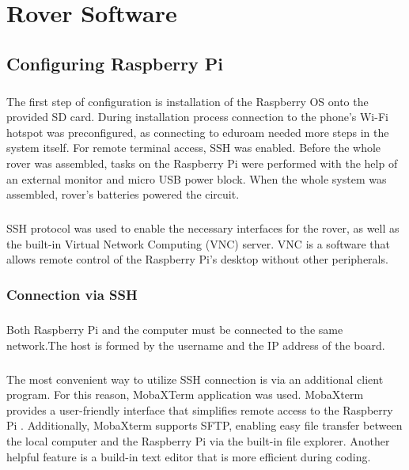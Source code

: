\chapter{Rover Software}
\section{Configuring Raspberry Pi}
\paragraph{}The first step of configuration is installation of the Raspberry OS onto the provided SD card. During installation process connection to the phone’s Wi-Fi hotspot was preconfigured, as connecting to eduroam needed more steps in the system itself. For remote terminal access, SSH was enabled.
Before the whole rover was assembled, tasks on the  Raspberry Pi were performed with the help of an external monitor and micro USB power block. When the whole system was assembled, rover's batteries powered the circuit. 
\paragraph{}SSH protocol was used to enable the necessary interfaces for the rover, as well as the built-in Virtual Network Computing (VNC) server. VNC is a software that allows remote control of the Raspberry Pi’s desktop without other peripherals. 

\subsection{Connection via SSH}
\paragraph{}Both Raspberry Pi and the computer must be connected to the same network.The host is formed by the username and the IP address of the board. 
\paragraph{} The most convenient way to utilize SSH connection is via an additional client program. For this reason, MobaXTerm application was used. MobaXterm provides a user-friendly interface that simplifies remote access to the Raspberry Pi \cite{mobxterm:main}. Additionally, MobaXterm supports SFTP, enabling easy file transfer between the local computer and the Raspberry Pi via the built-in file explorer. Another helpful feature is a build-in text editor that is more efficient during coding. 

